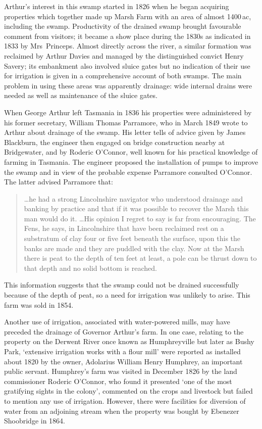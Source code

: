 Arthur's interest in this swamp started in 1826 when he began
acquiring properties which together made up Marsh Farm with an area of
almost 1400\,ac, including the swamp.  Productivity of the drained
swamp brought favourable comment from visitors; it became a show place
during the 1830s as indicated in 1833 by Mrs~Princeps.  Almost
directly across the river, a similar formation was reclaimed by Arthur
Davies and managed by the distinguished convict Henry Savery; its
embankment also involved sluice gates but no indication of their use
for irrigation is given in a comprehensive account of both swamps.
The main problem in using these areas was apparently drainage: wide
internal drains were needed as well as maintenance of the sluice
gates.

When George Arthur left Tasmania in 1836 his properties were
administered by his former secretary, William Thomas Parramore, who in
March 1849 wrote to Arthur about drainage of the swamp.  His letter
tells of advice given by James Blackburn, the engineer then engaged on
bridge construction nearby at Bridgewater, and by Roderic O'Connor,
well known for his practical knowledge of farming in Tasmania.  The
engineer proposed the installation of pumps to improve the swamp and
in view of the probable expense Parramore consulted O'Connor.  The
latter advised Parramore that:
\begin{quote}
	\ldots he had a strong Lincolnshire navigator who understood
	drainage and banking by practice and that if it was possible
	to recover the Marsh this man would do it. \ldots His opinion
	I regret to say is far from encouraging.  The Fens, he says,
	in Lincolnshire that have been reclaimed rest on a substratum
	of clay four or five feet beneath the surface, upon this the
	banks are made and they are puddled with the clay.  Now at the
	Marsh there is peat to the depth of ten feet at least, a pole
	can be thrust down to that depth and no solid bottom is
	reached.
\end{quote}
This information suggests that the swamp could not be drained
successfully because of the depth of peat, so a need for irrigation
was unlikely to arise.  This farm was sold in 1854.

Another use of irrigation, associated with water-powered mills, may
have preceded the drainage of Governor Arthur's farm.  In one case,
relating to the property on the Derwent River once known as
Humphreyville but later as Bushy Park, `extensive irrigation works
with a flour mill' were reported as installed about 1820 by the owner,
Adolarius William Henry Humphrey, an important public servant.
Humphrey's farm was visited in December 1826 by the land commissioner
Roderic O'Connor, who found it presented `one of the most gratifying
sights in the colony', commented on the crops and livestock but failed
to mention any use of irrigation.  However, there were facilities for
diversion of water from an adjoining stream when the property was
bought by Ebenezer Shoobridge in 1864.

